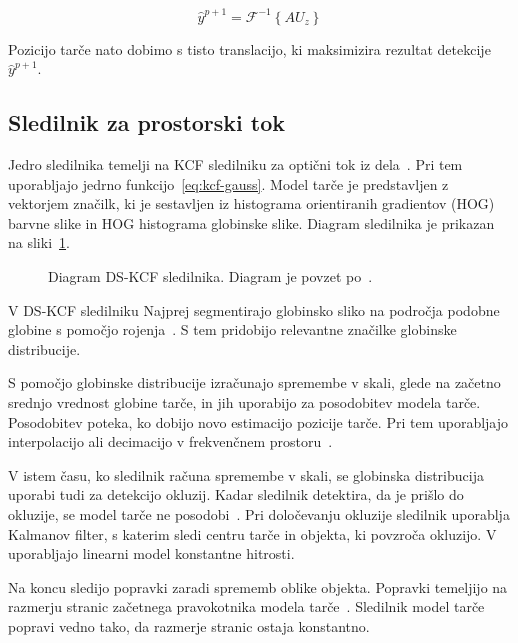 \begin{equation}
\hat{y}^{p + 1} = \mathcal{F}^{-1}\left\{ A U_z \right\}
\label{eq:detection-score}
\end{equation}

Pozicijo tarče nato dobimo s tisto translacijo, ki maksimizira rezultat detekcije $\hat{y}^{p+1}$.












\subsection{Sledilnik za prostorski tok}
Jedro sledilnika temelji na KCF sledilniku za optični tok iz dela~\cite{henriques2015high}. Pri tem uporabljajo jedrno funkcijo~\eqref{eq:kcf-gauss}. Model tarče je predstavljen z vektorjem značilk, ki je sestavljen iz histograma orientiranih gradientov (HOG) barvne slike in HOG histograma globinske slike. Diagram sledilnika je prikazan na sliki~\ref{fig:diagram-dskcf}.

\begin{figure}[htb]
	\centering
	
	\caption[Diagram DS-KCF sledilnika]{Diagram DS-KCF sledilnika. Diagram je povzet po~\cite{hannuna2016ds}.}
	\label{fig:diagram-dskcf}
\end{figure}

V DS-KCF sledilniku Najprej segmentirajo globinsko sliko na področja podobne globine s pomočjo rojenja~\cite{hannuna2016ds}. S tem pridobijo relevantne značilke globinske distribucije. 

S pomočjo globinske distribucije izračunajo spremembe v skali, glede na začetno srednjo vrednost globine tarče, in jih uporabijo za posodobitev modela tarče. Posodobitev poteka, ko dobijo novo estimacijo pozicije tarče. Pri tem uporabljajo interpolacijo ali decimacijo v frekvenčnem prostoru~\cite{hannuna2016ds}.

V istem času, ko sledilnik računa spremembe v skali, se globinska distribucija uporabi tudi za detekcijo okluzij. Kadar sledilnik detektira, da je prišlo do okluzije, se model tarče ne posodobi~\cite{hannuna2016ds}. Pri določevanju okluzije sledilnik uporablja Kalmanov filter, s katerim sledi centru tarče in objekta, ki povzroča okluzijo. V~\cite{hannuna2016ds} uporabljajo linearni model konstantne hitrosti.  

Na koncu sledijo popravki zaradi sprememb oblike objekta. Popravki temeljijo na razmerju stranic začetnega pravokotnika modela tarče~\cite{hannuna2016ds}. Sledilnik model tarče popravi vedno tako, da razmerje stranic ostaja konstantno.






